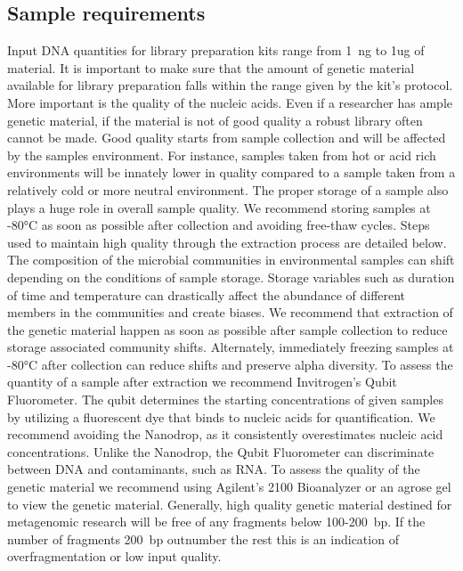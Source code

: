 \documentclass[graybox]{svmult}
\begin{document}
\subsection{Sample requirements }
\label{subsec:4}
%
Input DNA quantities for library preparation kits range from 1~ng to  1ug of material. It is important to make sure that the amount of genetic material available for library preparation falls within the range given by the kit's protocol.
%
More important is the quality of the nucleic acids. Even if a researcher has ample genetic material, if the material is not of good quality a robust library often cannot be made. Good quality starts from sample collection and will be affected by the samples environment. For instance, samples taken from hot or acid rich environments will be innately lower in quality compared to a sample taken from a relatively cold or more neutral environment.
%
The proper storage of a sample also plays a huge role in overall sample quality. We recommend storing samples at -80°C as soon as possible after collection and avoiding free-thaw cycles. Steps used to maintain high quality through the extraction process are detailed below.
%
The composition of the microbial communities in environmental samples can shift depending on the conditions of sample storage. Storage variables such as duration of time and temperature can drastically affect the abundance of different members in the communities and create biases. We recommend that extraction of the genetic material happen as soon as possible after sample collection to reduce storage associated community shifts. Alternately, immediately freezing samples at -80°C after collection can reduce shifts and preserve alpha diversity.\cite{Rubin}
%
To assess the quantity of a sample after extraction we recommend Invitrogen’s Qubit Fluorometer. The qubit determines the starting concentrations of given samples by utilizing a fluorescent dye that binds to nucleic acids for quantification. We recommend avoiding the Nanodrop, as it consistently overestimates nucleic acid concentrations. Unlike the Nanodrop, the Qubit Fluorometer can discriminate between DNA and contaminants, such as RNA.
%
To assess the quality of the genetic material we recommend using Agilent’s 2100 Bioanalyzer or an agrose gel to view the genetic material. Generally, high quality genetic material destined for metagenomic research will be free of any fragments below 100-200~bp.  If the number of fragments 200~bp outnumber the rest this is an indication of overfragmentation or low input quality.
\end{document}
